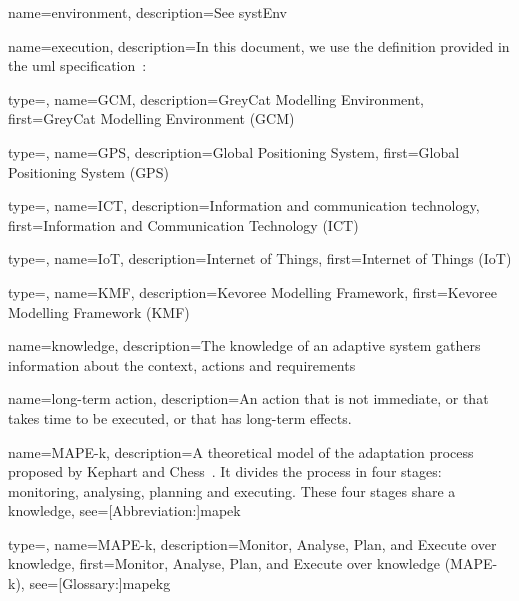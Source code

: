 {
	name={envi\-ron\-ment},
	description={See \gls{systEnv}}
}

{
	name={exe\-cu\-tion},
	description={In this document, we use the definition provided in the \gls{uml} specification~\cite{omg2017umlspec}: }
}

{
	type=\acronymtype,
	name={GCM},
	description={GreyCat Modelling Environment},
	first={GreyCat Modelling Environment (GCM)}
}

{
	type=\acronymtype,
	name={GPS},
	description={Global Positioning System},
	first={Global Positioning System (GPS)}
}

{
	type=\acronymtype,
	name={ICT},
	description={Information and communication technology},
	first={Information and Communication Technology (ICT)}
}

{
	type=\acronymtype,
	name={IoT},
	description={Internet of Things},
	first={Internet of Things (IoT)}
}

{
	type=\acronymtype,
	name={KMF},
	description={Kevoree Modelling Framework},
	first={Kevoree Modelling Framework (KMF)}
}

{
	name={knowl\-ed\-ge},
	description={The knowledge of an adaptive system gathers information about the \gls{context}, \glspl{action} and \glspl{requirement}}
}

{
	name={long-term action},
	description={An \gls{action} that is not immediate, or that takes time to be executed, or that has long-term effects.}
}

{
	name={MAPE-k},
    description={A theoretical model of the adaptation process proposed by Kephart and Chess~\cite{DBLP:journals/computer/KephartC03}. It divides the process in four stages: monitoring, analysing, planning and executing. These four stages share a \gls{knowledge}},
    see=[Abbreviation:]{mapek}
}

{
	type=\acronymtype, 
	name={MAPE-k}, 
	description={Monitor, Analyse, Plan, and Execute over knowledge}, 
	first={Monitor, Analyse, Plan, and Execute over knowledge (MAPE-k)}, 
	see=[Glossary:]{mapekg}
}

